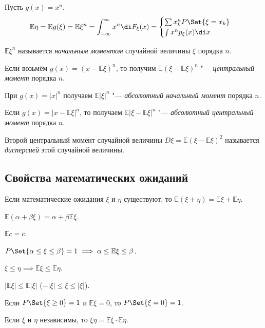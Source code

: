 \begin{definition}
	Пусть $ g(x) = x^n $.
	$$ \mathbb E \eta = \mathbb E g(\xi) = \mathbb E \xi^n =
	\int_{-\infty}^\infty x^n \di F_\xi(x) =
	\begin{cases}
		\sum x_k^n P\Set{\xi = x_k} \\
		\int x^n p_\xi(x) \di x
	\end{cases} $$

	$ \mathbb E \xi^n $ называется \emph{начальным моментом} случайной величины
	$ \xi $ порядка $ n $.
\end{definition}

\begin{definition}
	Если возьмём $ g(x) = (x - \mathbb E \xi)^n $, то получим
	$ \mathbb E(\xi - \mathbb E \xi)^n $ "--- \emph{центральный момент} порядка $ n $.
\end{definition}

\begin{definition}
	При $ g(x) = |x|^n $ получаем $ \mathbb E|\xi|^n $ "--- \emph{абсолютный начальный момент}
	порядка $ n $.
\end{definition}

\begin{definition}
	Если $ g(x) = |x - \mathbb E \xi|^n $, то получаем $ \mathbb E|\xi - \mathbb E \xi|^n $ "---
	\emph{абсолютный центральный момент} порядка $ n $.
\end{definition}

\begin{definition}
	Второй центральный момент случайной величины $ D \xi = \mathbb E(\xi - \mathbb E \xi)^2 $
	называется \emph{дисперсией} этой случайной величины.
\end{definition}

\subsection{Свойства математических ожиданий}

\begin{props}
\item Если математические ожидания $ \xi $ и $ \eta $ существуют, то
	$ \mathbb E(\xi + \eta) = \mathbb E \xi + \mathbb E \eta $.
\item $ \mathbb E(\alpha + \beta \xi) = \alpha + \beta \mathbb E\xi $.
\item $ \mathbb E c = c $.
\item $ P\Set{\alpha \le \xi \le \beta} = 1 \implies \alpha \le \mathbb E \xi \le \beta $.
\item $ \xi \le \eta \implies \mathbb E \xi \le \mathbb E \eta $.
\item $ |\mathbb E \xi| \le \mathbb E |\xi| $ (\as $ -|\xi| \le \xi \le |\xi| $).
\item Если $ P \Set{\xi \ge 0} = 1 $ и $ \mathbb E \xi = 0 $, то $ P\Set{\xi = 0} = 1 $.
\item Если $ \xi $ и $ \eta $ независимы, то $ \mathbb \xi \eta =
	\mathbb E \xi \cdot \mathbb E \eta $.
\end{props}

